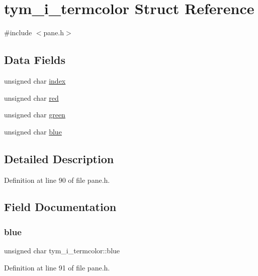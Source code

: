 \hypertarget{structtym__i__termcolor}{}\section{tym\+\_\+i\+\_\+termcolor Struct Reference}
\label{structtym__i__termcolor}


{\ttfamily \#include $<$pane.\+h$>$}

\subsection*{Data Fields}
\begin{DoxyCompactItemize}
\item 
unsigned char \hyperlink{structtym__i__termcolor_a585cff3cf5a42dfe19f69eb5e82e5e1f}{index}
\item 
unsigned char \hyperlink{structtym__i__termcolor_a8a900030d25c4baca2956508afeab5b9}{red}
\item 
unsigned char \hyperlink{structtym__i__termcolor_a092c59261dd150740bb26bc7d991248d}{green}
\item 
unsigned char \hyperlink{structtym__i__termcolor_ab2785bdbdbfbdf5b11e675449daf76c7}{blue}
\end{DoxyCompactItemize}


\subsection{Detailed Description}


Definition at line 90 of file pane.\+h.



\subsection{Field Documentation}
\mbox{\label{structtym__i__termcolor_ab2785bdbdbfbdf5b11e675449daf76c7}} 
\subsubsection{\texorpdfstring{blue}{blue}}
{\footnotesize\ttfamily unsigned char tym\+\_\+i\+\_\+termcolor\+::blue}



Definition at line 91 of file pane.\+h.

